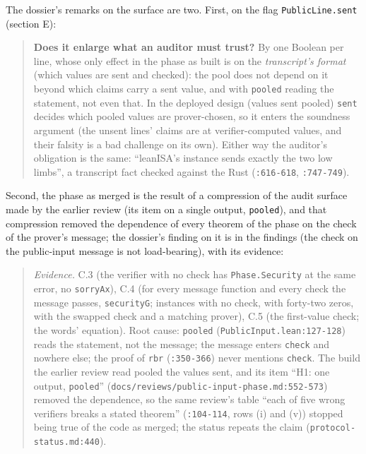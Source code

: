 The dossier's remarks on the surface are two. First, on the flag \texttt{PublicLine.\allowbreak{}sent} (section E): 

\begin{quote}
\textbf{Does it enlarge what an auditor must trust?} By one Boolean per line, whose only effect in the phase as built is on the \emph{transcript's format} (which values are sent and checked): the pool does not depend on it beyond which claims carry a sent value, and with \texttt{pooled} reading the statement, not even that. In the deployed design (values sent pooled) \texttt{sent} decides which pooled values are prover-chosen, so it enters the soundness argument (the unsent lines' claims are at verifier-computed values, and their falsity is a bad challenge on its own). Either way the auditor's obligation is the same: \enquote{leanISA's instance sends exactly the two low limbs}, a transcript fact checked against the Rust (\texttt{:616-{}618}, \texttt{:747-{}749}).
\end{quote}

Second, the phase as merged is the result of a compression of the audit surface made by the earlier review (its item on a single output, \texttt{pooled}), and that compression removed the dependence of every theorem of the phase on the check of the prover's message; the dossier's finding on it is in the findings (the check on the public-input message is not load-bearing), with its evidence:

\begin{quote}
\emph{Evidence.} C.3 (the verifier with no check has \texttt{Phase.\allowbreak{}Security} at the same error, no \texttt{sorryAx}), C.4 (for every message function and every check the message passes, \texttt{securityG}; instances with no check, with forty-two zeros, with the swapped check and a matching prover), C.5 (the first-value check; the words' equation). Root cause: \texttt{pooled} (\texttt{PublicInput.\allowbreak{}lean:127-{}128}) reads the statement, not the message; the message enters \texttt{check} and nowhere else; the proof of \texttt{rbr} (\texttt{:350-{}366}) never mentions \texttt{check}. The build the earlier review read pooled the values sent, and its item \enquote{H1: one output, \texttt{pooled}} (\texttt{d\allowbreak{}o\allowbreak{}c\allowbreak{}s\allowbreak{}/\allowbreak{}r\allowbreak{}e\allowbreak{}v\allowbreak{}i\allowbreak{}e\allowbreak{}w\allowbreak{}s\allowbreak{}/\allowbreak{}p\allowbreak{}u\allowbreak{}b\allowbreak{}l\allowbreak{}i\allowbreak{}c\allowbreak{}-{}\allowbreak{}i\allowbreak{}n\allowbreak{}p\allowbreak{}u\allowbreak{}t\allowbreak{}-{}\allowbreak{}p\allowbreak{}h\allowbreak{}a\allowbreak{}s\allowbreak{}e\allowbreak{}.\allowbreak{}m\allowbreak{}d\allowbreak{}:\allowbreak{}5\allowbreak{}5\allowbreak{}2\allowbreak{}-{}\allowbreak{}5\allowbreak{}7\allowbreak{}3}) removed the dependence, so the same review's table \enquote{each of five wrong verifiers breaks a stated theorem} (\texttt{:104-{}114}, rows (i) and (v)) stopped being true of the code as merged; the status repeats the claim (\texttt{protocol-{}status.\allowbreak{}md:440}).
\end{quote}
